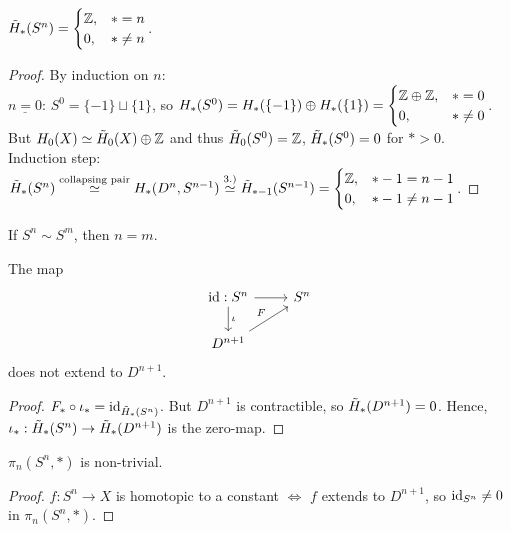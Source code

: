 \documentclass[a4paper,11pt]{article}
\begin{document}
				\begin{prop}
					$\rhg{S^n}=\begin{cases}
						\Z, & \ast=n\\0, & \ast\neq n
					\end{cases}$.
				\end{prop}
				\begin{proof}
					By induction on $n$:\\ $\underline{n=0}$: $S^0=\{-1\}\sqcup\{1\}$, so $\hg{S^0}=\hg{\{-1\}}\oplus\hg{\{1\}}=\begin{cases}
						\Z\oplus\Z,& \ast=0\\0,& \ast\neq0
					\end{cases}$. But $\hg[0]{X}\simeq\rhg[0]{X}\oplus\Z$ and thus $\rhg[0]{S^0}=\Z$, $\rhg{S^0}=0$ for $\ast>0$.\\
					Induction step: $\rhg{S^n}\overset{\text{collapsing pair}}{\simeq}\hg{D^n,S^{n-1}}\overset{3.)}{\simeq}\rhg[\ast-1]{S^{n-1}}=\begin{cases}
						\Z,& \ast-1=n-1\\0,& \ast-1\neq n-1
					\end{cases}$.
				\end{proof}

				\begin{cor}
					If $S^n\sim S^m$, then $n=m$.
				\end{cor}

				\begin{cor}
					The map
					\begin{equation*}
						\begin{tikzcd}
							\id:S^n \ar[d,"\iota"]\ar[r]& S^{n}\\
							 D^{n+1}\ar[ur,"F"]&
						\end{tikzcd}
					\end{equation*}
					does not extend to $D^{n+1}$.
				\end{cor}
				\begin{proof}
					$F_\ast\circ\iota_\ast=\id_{\rhg{S^n}}$. But $D^{n+1}$ is contractible, so $\rhg{D^{n+1}}=0$. Hence, $\iota_\ast:\rhg{S^n}\rightarrow \rhg{D^{n+1}}$ is the zero-map.
				\end{proof}

				\begin{cor}
					$\pi_n(S^n,\ast)$ is non-trivial.
				\end{cor}
				\begin{proof}
					$f:S^n\rightarrow X$ is homotopic to a constant $\Leftrightarrow$ $f$ extends to $D^{n+1}$, so $\id_{S^n}\neq0$ in $\pi_n(S^n,\ast)$.
				\end{proof}
\end{document}

